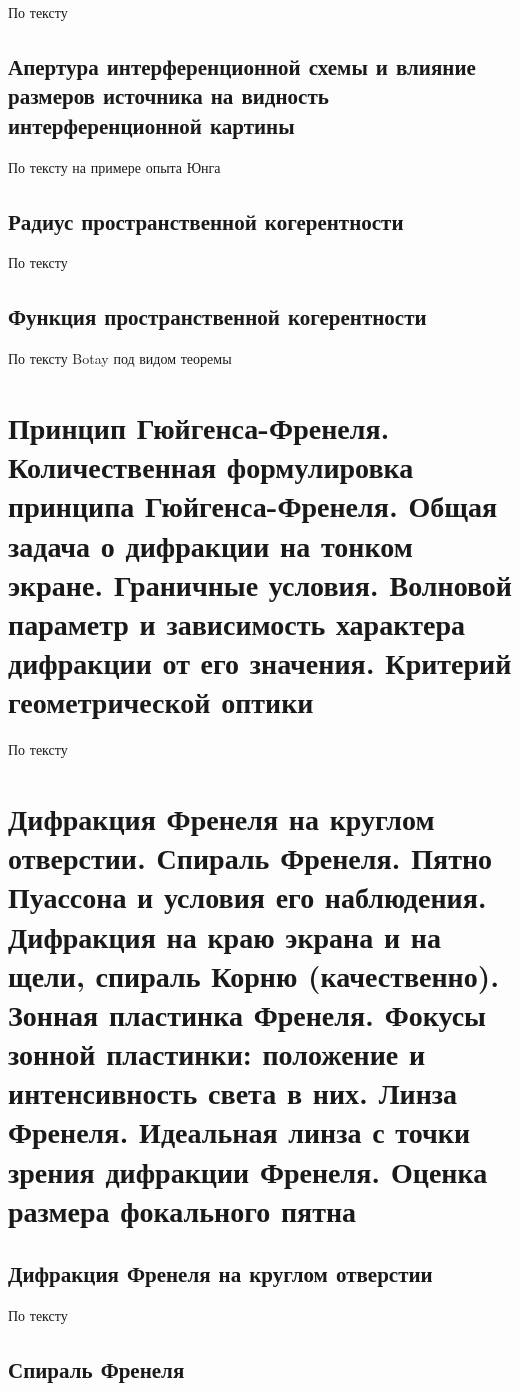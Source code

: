 \documentclass[a4paper, 14pt]{article}
\begin{document}
    По тексту
    
    \subsection{Апертура интерференционной схемы и влияние размеров источника на видность интерференционной картины}
    
    По тексту на примере опыта Юнга
    
    \subsection{Радиус пространственной когерентности}
    
    По тексту
    
    \subsection{Функция пространственной когерентности}
    
    По тексту Botay под видом теоремы
    
    \section{Принцип Гюйгенса-Френеля.
    Количественная формулировка принципа Гюйгенса-Френеля.
    Общая задача о дифракции на тонком экране.
    Граничные условия.
    Волновой параметр и зависимость характера дифракции от его значения.
    Критерий геометрической оптики}
    
    По тексту
    
    \section{Дифракция Френеля на круглом отверстии.
    Спираль Френеля.
    Пятно Пуассона и условия его наблюдения.
    Дифракция на краю экрана и на щели, спираль Корню (качественно).
    Зонная пластинка Френеля.
    Фокусы зонной пластинки: положение и интенсивность света в них.
    Линза Френеля.
    Идеальная линза с точки зрения дифракции Френеля.
    Оценка размера фокального пятна}
    
    \subsection{Дифракция Френеля на круглом отверстии}
    
    По тексту
    
    \subsection{Спираль Френеля}
    
\end{document}
